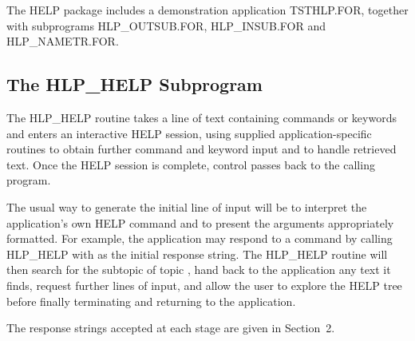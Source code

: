 The HELP package includes a demonstration application TSTHLP.FOR,
together with subprograms HLP\_OUTSUB.FOR, HLP\_INSUB.FOR and HLP\_NAMETR.FOR.

\subsection{The HLP\_HELP Subprogram}
The HLP\_HELP routine takes a line of text containing commands
or keywords and enters an interactive HELP session, using supplied
application-specific routines to obtain further command and keyword
input and to handle retrieved text.  Once the HELP session is complete,
control passes back to the calling program.

The usual way to generate the initial line of input will be to
interpret the application's own HELP command and to present the
arguments appropriately formatted.  For example, the application may
respond to a command  by calling HLP\_HELP with
 as the initial response string.  The HLP\_HELP routine
will then search for the subtopic  of topic ,
hand back to the application any text it finds, request further lines
of input, and allow the user to explore the HELP tree before finally
terminating and returning to the application.

The response strings accepted at each stage are given in
Section~2.

